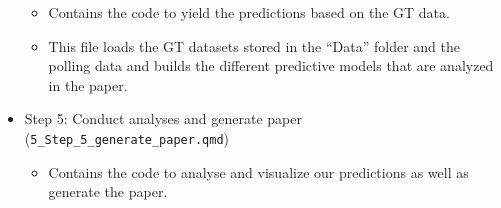 \documentclass[
  letterpaper,
  DIV=11,
  numbers=noendperiod]{scrartcl}
\providecommand{\tightlist}{%
  \setlength{\itemsep}{0pt}\setlength{\parskip}{0pt}}\usepackage{longtable,booktabs,array}
\begin{document}
\begin{itemize}
  \begin{itemize}
  \tightlist
  \item
    Contains the code to yield the predictions based on the GT data.
  \item
    This file loads the GT datasets stored in the ``Data'' folder and
    the polling data and builds the different predictive models that are
    analyzed in the paper.
  \end{itemize}
\item
  Step 5: Conduct analyses and generate paper
  (\texttt{5\_Step\_5\_generate\_paper.qmd})

  \begin{itemize}
  \tightlist
  \item
    Contains the code to analyse and visualize our predictions as well
    as generate the paper.
  \end{itemize}
\end{itemize}
\end{document}
